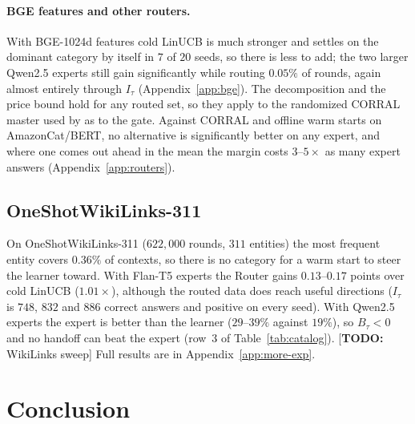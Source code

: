 \documentclass{article}
\theoremstyle{definition}
\theoremstyle{remark}
\theoremstyle{remark}
\newcommand{\todo}[1]{\textcolor{red!70!black}{[\textbf{TODO:} #1]}}
\begin{document}
\paragraph{BGE features and other routers.}
With BGE-1024d features cold LinUCB is much stronger and settles on the
dominant category by itself in $7$ of $20$ seeds, so there is less to add; the
two larger Qwen2.5 experts still gain significantly while routing $0.05\%$ of
rounds, again almost entirely through $I_\tau$ (Appendix~\ref{app:bge}). The
decomposition and the price bound hold for any routed set, so they apply to
the randomized CORRAL master \cite{agarwal2017corralling} used by
\cite{chen2024llmdecision} as to the gate. Against CORRAL and offline warm
starts on AmazonCat/BERT, no alternative is significantly better on any
expert, and where one comes out ahead in the mean the margin costs $3$--$5\times$
as many expert answers (Appendix~\ref{app:routers}).

\subsection{OneShotWikiLinks-311}
\label{sec:wiki}

On OneShotWikiLinks-311 ($622{,}000$ rounds, $311$ entities) the most
frequent entity covers $0.36\%$ of contexts, so there is no category for a
warm start to steer the learner toward. With Flan-T5 experts the Router
gains $0.13$--$0.17$ points over cold LinUCB ($1.01\times$), although the
routed data does reach useful directions ($I_\tau$ is $748$, $832$ and $886$
correct answers and positive on every seed). With Qwen2.5 experts the expert
is better than the learner ($29$--$39\%$ against $19\%$), so $B_\tau<0$ and no
handoff can beat the expert (row~3 of Table~\ref{tab:catalog}).
\todo{WikiLinks sweep} Full results are in Appendix~\ref{app:more-exp}.

\section{Conclusion}
\label{sec:conclusion}
\end{document}
